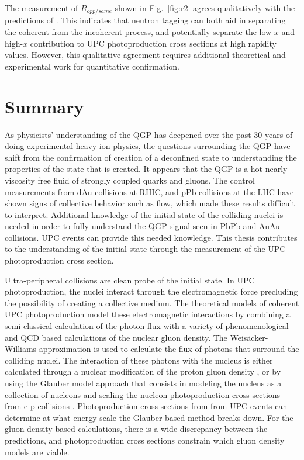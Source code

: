     The measurement of $R_{opp/same}$ shown in Fig.~\ref{fig:r2} agrees 
      qualitatively with the predictions of \cite{Guzey:2013jaa}.
    This indicates that neutron tagging can both aid in separating the coherent
      from the incoherent process, and potentially separate the low-$x$ and 
      high-$x$ contribution to UPC photoproduction cross sections at high 
      rapidity values. 
    However, this qualitative agreement requires additional theoretical and 
      experimental work for quantitative confirmation. 

  \section{\label{sec:summary}Summary}
    As physicists' understanding of the QGP has deepened over the past 30 years
      of doing experimental heavy ion physics, the questions surrounding the
      QGP have shift from the confirmation of creation of a deconfined state
      to understanding the properties of the state that is created.
    It appears that the QGP is a hot nearly viscosity free fluid of strongly 
      coupled quarks and gluons. 
    The control measurements from dAu collisions at RHIC, and pPb collisions
      at the LHC have shown signs of collective behavior such as flow, which 
      made these results difficult to interpret.
    Additional knowledge of the initial state of the colliding nuclei is needed
      in order to fully understand the QGP signal seen in PbPb and AuAu 
      collisions.
    UPC events can provide this needed knowledge. 
    This thesis contributes to the understanding of the initial state through
      the measurement of the UPC \JPsi{} photoproduction cross section. 
  
    Ultra-peripheral collisions are clean probe of the initial state. 
    In UPC \JPsi{} photoproduction, the nuclei interact through the 
      electromagnetic force precluding the possibility of creating a collective
      medium.
    The theoretical models of coherent UPC \JPsi{} photoproduction model these 
      electromagnetic interactions by combining a semi-classical calculation 
      of the photon flux with a variety of phenomenological and QCD based 
      calculations of the nuclear gluon density. 
    The Weis\"{a}cker-Williams approximation \cite{WWFermi} is used to calculate 
      the flux of photons that surround the colliding nuclei. 
    The interaction of these photons with the nucleus is either calculated 
      through a nuclear modification of the proton gluon density 
      \cite{pQCD2013.02, lta2012.03}, or by using the Glauber model approach 
      that consists in modeling the nucleus as a collection
      of nucleons and scaling the nucleon photoproduction cross sections from 
      e-p collisions \cite{vmd1999}. 
    Photoproduction cross sections from from UPC events can determine at what 
      energy scale the Glauber based method breaks down.
    For the gluon density based calculations, there is a wide discrepancy
      between the predictions, and photoproduction cross sections constrain which
      gluon density models are viable. 
  
